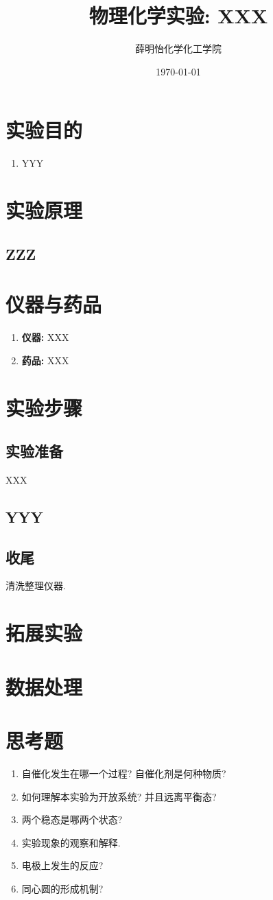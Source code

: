 \documentclass[a4paper]{article}
\title{物理化学实验: XXX}
\author{薛明怡\quad 151250177\quad 化学化工学院}
\date{\today}
\begin{document}
\maketitle
\section{实验目的}
\begin{enumerate}
\item YYY
\end{enumerate}
\section{实验原理}
\subsection{ZZZ}
\section{仪器与药品}
\begin{enumerate}
    \item \textbf{仪器:} XXX
    \item \textbf{药品:} XXX
\end{enumerate}
\section{实验步骤}
\subsection{实验准备}
XXX
\subsection{YYY}
\subsection{收尾}
清洗整理仪器.
\section{拓展实验}

\newpage
\section{数据处理}

\newpage
\section{思考题}
\begin{enumerate}
	\item 自催化发生在哪一个过程? 自催化剂是何种物质?
	\item 如何理解本实验为开放系统? 并且远离平衡态?
	\item 两个稳态是哪两个状态?
	\item 实验现象的观察和解释.
	\item 电极上发生的反应?
	\item 同心圆的形成机制?
\end{enumerate}
\newpage
\end{document}
